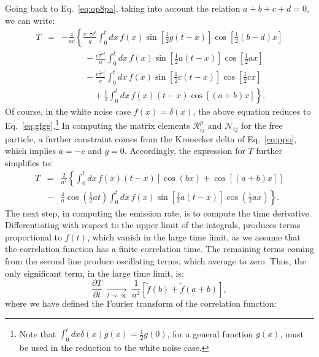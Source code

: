 \documentclass[12pt,onecolumn,amssymb,nofootinbib]{revtex4-2} %
\begin{document}
Going back to Eq.~\eqref{eq:op8pa}, taking into account the relation $a+b+c+d =
0$, we can write:
\begin{eqnarray} \label{eq:hdfgzds}
T & = & -\frac{4}{ac} \left\{ \frac{e^{-\frac{i}{2}g t}}{g}
\int_{0}^{t}dx\, f(x)\sin\left[\frac{1}{2}g(t-x)\right] \cos\left[\frac{1}{2}(b-d)x\right]
\right. \nonumber \\
& & \qquad\;\;\, -
\frac{e^{\frac{i}{2}at}}{a} \int_{0}^{t}dx\, f(x) \sin\left[\frac{1}{2}a(t-x)\right]
\cos\left[\frac{1}{2}ax\right] \nonumber \\
& & \qquad\;\;\, -
\frac{e^{\frac{i}{2}ct}}{c} \int_{0}^{t}dx\, f(x) \sin\left[\frac{1}{2}c(t-x)\right]
\cos\left[\frac{1}{2}cx\right] \nonumber \\
& & \left. \qquad\quad\;\;\, +
\frac{1}{2} \int_{0}^{t}dx\, f(x)(t-x)\cos\left[(a+b)x\right]\right\}.
\end{eqnarray}
Of course, in the white noise case $f(x) = \delta(x)$, the above
equation reduces to Eq.~\eqref{eq:gfgg}.\footnote{Note that
$\int_0^t dx \delta(x)g(x)=\frac{1}{2}g(0)$, for a general function
$g(x)$, must be used
 in the reduction to the white noise case.} In computing the matrix elements ${\mathcal
R}_{ij}^{p}$ and ${\mathcal N}_{ij}$ for the free particle, a further
constraint comes from the Kronecker delta of Eq.~\eqref{eq:ppo}, which implies
$a = - c$ and $g = 0$. Accordingly, the expression for $T$ further simplifies
to:
\begin{eqnarray}
T & = & \frac{2}{a^{2}} \left\{ \int_{0}^{t}dx\, f(x)(t-x)\left[ \cos(bx)+
\cos[(a+b)x] \right] \right. \nonumber \\
& - & \left. \frac{4}{a}\cos\left( \frac{1}{2}at\right) \int_{0}^{t}dx\, f(x)
\sin\left[\frac{1}{2}a(t-x)\right] \cos\left(\frac{1}{2}ax\right) \right\}.
\end{eqnarray}
The next step, in computing the emission rate, is to compute the time
derivative. Differentiating with respect to the upper limit of the integrals,
produces terms proportional to $f(t)$, which vanish in the large time limit, as
we assume that the correlation function has a finite correlation time. The
remaining terms coming from the second line produce oscillating terms, which
average to zero. Thus, the only significant term, in the large time limit, is:
\begin{equation}
\frac{\partial T}{\partial t} \; \xrightarrow[t \,\rightsquigarrow \, \infty]{} \;
\frac{1}{a^2} \left[ \tilde{f}(b) + \tilde{f}(a + b) \right],
\end{equation}
where we have defined the Fourier transform of the correlation function:
\end{document}
